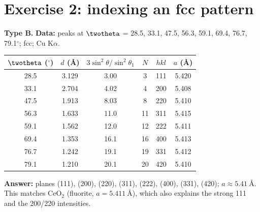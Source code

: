 \section{Exercise 2: indexing an fcc pattern}
\textbf{Type B.} \textbf{Data:} peaks at $\twotheta$ = 28.5, 33.1, 47.5, 56.3, 59.1, 69.4, 76.7, 79.1$^\circ$\readoff; fcc;
Cu K$\alpha$.

\begin{center}
\small
\begin{tabular}{@{}cccccc@{}}
\toprule
$\twotheta$ ($^\circ$) & $d$ (\AA) & $3\sin^2\theta/\sin^2\theta_1$ & $N$ & $hkl$ & $a$ (\AA) \\ \midrule
28.5 & 3.129 & 3.00 & 3 & 111 & 5.420 \\
33.1 & 2.704 & 4.02 & 4 & 200 & 5.408 \\
47.5 & 1.913 & 8.03 & 8 & 220 & 5.410 \\
56.3 & 1.633 & 11.0 & 11 & 311 & 5.415 \\
59.1 & 1.562 & 12.0 & 12 & 222 & 5.411 \\
69.4 & 1.353 & 16.1 & 16 & 400 & 5.413 \\
76.7 & 1.242 & 19.1 & 19 & 331 & 5.412 \\
79.1 & 1.210 & 20.1 & 20 & 420 & 5.410 \\
\bottomrule
\end{tabular}
\end{center}
\textbf{Answer:} planes (111), (200), (220), (311), (222), (400), (331), (420); $\boxed{a \approx \SI{5.41}{\angstrom}}$.
This matches CeO$_2$ (fluorite, $a = \SI{5.411}{\angstrom}$), which also explains the strong 111 and the 200/220 intensities.

